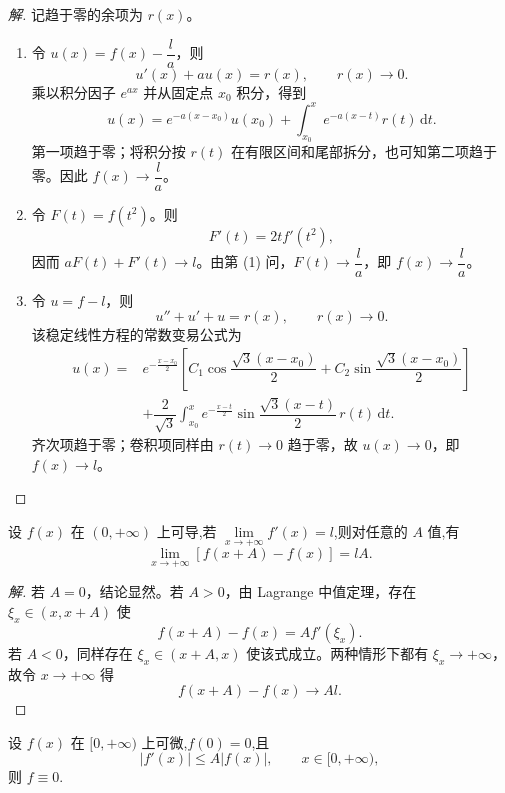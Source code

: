 \documentclass[../../数学分析培优讲义(答案版).tex]{subfiles}
\begin{document}
\begin{proof}[解]
记趋于零的余项为 $r(x)$。

\begin{enumerate}[label=(\arabic*)]
    \item 令 $u(x)=f(x)-\dfrac{l}{a}$，则
    \[
        u'(x)+au(x)=r(x),
        \qquad r(x)\to0.
    \]
    乘以积分因子 $e^{ax}$ 并从固定点 $x_0$ 积分，得到
    \[
        u(x)=e^{-a(x-x_0)}u(x_0)
        +\int_{x_0}^{x}e^{-a(x-t)}r(t)\,\mathrm{d}t.
    \]
    第一项趋于零；将积分按 $r(t)$ 在有限区间和尾部拆分，也可知第二项趋于零。因此 $f(x)\to\dfrac{l}{a}$。

    \item 令 $F(t)=f(t^2)$。则
    \[
        F'(t)=2t f'(t^2),
    \]
    因而 $aF(t)+F'(t)\to l$。由第 (1) 问，$F(t)\to\dfrac{l}{a}$，即 $f(x)\to\dfrac{l}{a}$。

    \item 令 $u=f-l$，则
    \[
        u''+u'+u=r(x),
        \qquad r(x)\to0.
    \]
    该稳定线性方程的常数变易公式为
    \[
    \begin{aligned}
        u(x)={}&e^{-\frac{x-x_0}{2}}
        \left[C_1\cos\dfrac{\sqrt3(x-x_0)}{2}
        +C_2\sin\dfrac{\sqrt3(x-x_0)}{2}\right]\\
        &+\dfrac{2}{\sqrt3}\int_{x_0}^{x}e^{-\frac{x-t}{2}}
        \sin\dfrac{\sqrt3(x-t)}{2}\,r(t)\,\mathrm{d}t.
    \end{aligned}
    \]
    齐次项趋于零；卷积项同样由 $r(t)\to0$ 趋于零，故 $u(x)\to0$，即 $f(x)\to l$。
\end{enumerate}
\end{proof}

\begin{example}
设 $f(x)$ 在 $(0,+\infty)$ 上可导,若 $\displaystyle\lim\limits_{x\to+\infty}f'(x)=l$,则对任意的 $A$ 值,有
\[
    \lim\limits_{x\to+\infty}[f(x+A)-f(x)]=lA.
\]
\end{example}

\begin{proof}[解]
若 $A=0$，结论显然。若 $A>0$，由 Lagrange 中值定理，存在 $\xi_x\in(x,x+A)$ 使
\[
    f(x+A)-f(x)=Af'(\xi_x).
\]
若 $A<0$，同样存在 $\xi_x\in(x+A,x)$ 使该式成立。两种情形下都有 $\xi_x\to+\infty$，故令 $x\to+\infty$ 得
\[
    f(x+A)-f(x)\longrightarrow Al.
\]
\end{proof}

\begin{example}[\markstar]
设 $f(x)$ 在 $\lbrack 0,+\infty)$ 上可微,$f(0)=0$,且
\[
    |f'(x)|\leq A|f(x)|,
    \qquad x\in\lbrack 0,+\infty),
\]
则 $f\equiv0$.
\end{example}
\end{document}
